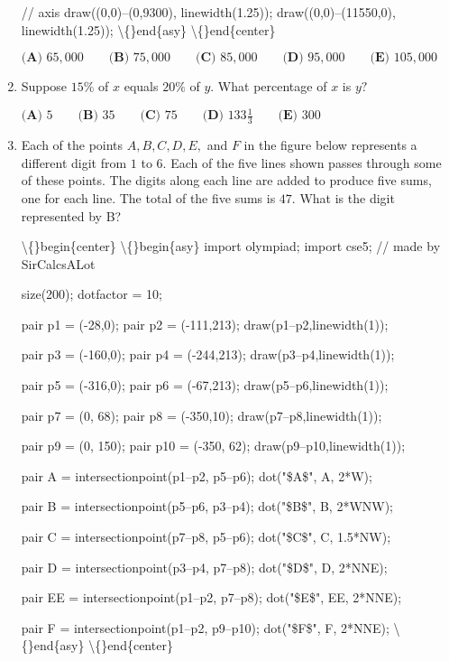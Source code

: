 \documentclass{article}
\begin{document}
\begin{enumerate}[label=\arabic*., itemsep=0.5em]
// axis
draw((0,0)--(0,9300), linewidth(1.25));
draw((0,0)--(11550,0), linewidth(1.25));
\textbackslash\{\}end\{asy\}
\textbackslash\{\}end\{center\}


\(\textbf{(A) }65{,}000 \qquad \textbf{(B) }75{,}000 \qquad \textbf{(C) }85{,}000 \qquad \textbf{(D) }95{,}000 \qquad \textbf{(E) }105{,}000\)\par \vspace{0.5em}\item Suppose \(15\%\) of \(x\) equals \(20\%\) of \(y.\) What percentage of \(x\) is \(y?\)

\(\textbf{(A) }5 \qquad \textbf{(B) }35 \qquad \textbf{(C) }75 \qquad \textbf{(D) }133 \frac13 \qquad \textbf{(E) }300\)\par \vspace{0.5em}\item Each of the points \(A,B,C,D,E,\) and \(F\) in the figure below represents a different digit from \(1\) to \(6.\) Each of the five lines shown passes through some of these points. The digits along each line are added to produce five sums, one for each line. The total of the five sums is \(47.\) What is the digit represented by B?


\textbackslash\{\}begin\{center\}
\textbackslash\{\}begin\{asy\}
import olympiad;
import cse5;
// made by SirCalcsALot

size(200);
dotfactor = 10;

pair p1 = (-28,0);
pair p2 = (-111,213);
draw(p1--p2,linewidth(1));

pair p3 = (-160,0);
pair p4 = (-244,213);
draw(p3--p4,linewidth(1));

pair p5 = (-316,0);
pair p6 = (-67,213);
draw(p5--p6,linewidth(1));

pair p7 = (0, 68);
pair p8 = (-350,10);
draw(p7--p8,linewidth(1));

pair p9 = (0, 150);
pair p10 = (-350, 62);
draw(p9--p10,linewidth(1));

pair A = intersectionpoint(p1--p2, p5--p6);
dot("\$A\$", A, 2*W);

pair B = intersectionpoint(p5--p6, p3--p4);
dot("\$B\$", B, 2*WNW);

pair C = intersectionpoint(p7--p8, p5--p6);
dot("\$C\$", C, 1.5*NW);

pair D = intersectionpoint(p3--p4, p7--p8);
dot("\$D\$", D, 2*NNE);

pair EE = intersectionpoint(p1--p2, p7--p8);
dot("\$E\$", EE, 2*NNE);

pair F = intersectionpoint(p1--p2, p9--p10);
dot("\$F\$", F, 2*NNE);
\textbackslash\{\}end\{asy\}
\textbackslash\{\}end\{center\}



\end{enumerate}
\end{document}
